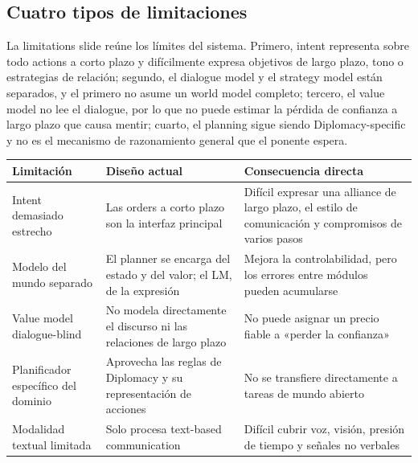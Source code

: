 

\subsection{Cuatro tipos de limitaciones}

La limitations slide reúne los límites del sistema. Primero, intent representa sobre todo actions a corto plazo y difícilmente expresa objetivos de largo plazo, tono o estrategias de relación; segundo, el dialogue model y el strategy model están separados, y el primero no asume un world model completo; tercero, el value model no lee el dialogue, por lo que no puede estimar la pérdida de confianza a largo plazo que causa mentir; cuarto, el planning sigue siendo Diplomacy-specific y no es el mecanismo de razonamiento general que el ponente espera.


\begin{longtable}{L{0.22\textwidth}L{0.31\textwidth}L{0.37\textwidth}}
\toprule
Limitación & Diseño actual & Consecuencia directa \\
\midrule
Intent demasiado estrecho & Las orders a corto plazo son la interfaz principal & Difícil expresar una alliance de largo plazo, el estilo de comunicación y compromisos de varios pasos \\
Modelo del mundo separado & El planner se encarga del estado y del valor; el LM, de la expresión & Mejora la controlabilidad, pero los errores entre módulos pueden acumularse \\
Value model dialogue-blind & No modela directamente el discurso ni las relaciones de largo plazo & No puede asignar un precio fiable a «perder la confianza» \\
Planificador específico del dominio & Aprovecha las reglas de Diplomacy y su representación de acciones & No se transfiere directamente a tareas de mundo abierto \\
Modalidad textual limitada & Solo procesa text-based communication & Difícil cubrir voz, visión, presión de tiempo y señales no verbales \\
\bottomrule
\end{longtable}

